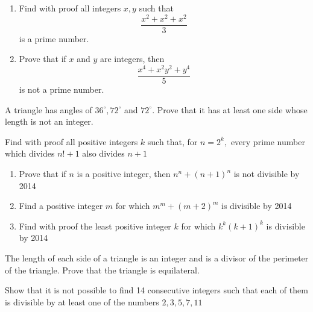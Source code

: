 \documentclass{pset}
\begin{document}
\begin{problems}
    \begin{problem}
    \begin{enumerate}

        \item Find with proof all integers \(x, y\) such that
              $$
                  \frac{x^{2}+x^{2}+x^{2}}{3}
              $$
              is a prime number.
        \item Prove that if \(x\) and \(y\) are integers, then
              $$
                  \frac{x^{4}+x^{2} y^{2}+y^{4}}{5}
              $$
              is not a prime number.
    \end{enumerate}
    \end{problem}

    \begin{problem}
    A triangle has angles of \(36^{\circ}, 72^{\circ}\) and \(72^{\circ} .\) Prove that it has at least one side whose length is not
    an integer.
    \end{problem}

    \begin{problem}
    Find with proof all positive integers \(k\) such that, for \(n=2^{k},\) every prime number which divides \(n !+1\) also divides \(n+1\)
    \end{problem}

    \begin{problem}
    \begin{enumerate}

        \item  Prove that if \(n\) is a positive integer, then \(n^{n}+(n+1)^{n}\) is not divisible by 2014
        \item  Find a positive integer \(m\) for which \(m^{m}+(m+2)^{m}\) is divisible by 2014
        \item  Find with proof the least positive integer \(k\) for which \(k^{k}(k+1)^{k}\) is divisible by 2014

    \end{enumerate}
    \end{problem}


    \begin{problem}
    The length of each side of a triangle is an integer and is a divisor of the perimeter of the triangle. Prove that the triangle is equilateral.
    \end{problem}

    \begin{problem}
    Show that it is not possible to find 14 consecutive integers such that each of them is divisible by at least one of the numbers \(2,3,5,7,11\)
    \end{problem}


\end{problems}
\end{document}
